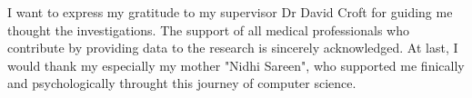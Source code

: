 I want to express my gratitude to my supervisor Dr David Croft for guiding me thought the investigations. 
The support of all medical professionals who contribute by providing data to the research is sincerely acknowledged. 
At last, I would thank my especially my mother "Nidhi Sareen", who supported me finically and psychologically throught this journey of computer science.